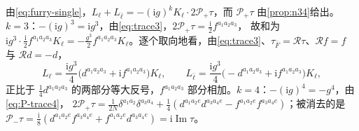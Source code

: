 \documentclass[UTF8,a4paper,11pt,fontset=fandol]{ctexart}
\makeatletter
\theoremstyle{cplain}
\theoremstyle{cdefinition}
\theoremstyle{cremark}
\renewcommand{\proofname}{证明}
\renewenvironment{proof}[1][\proofname]{\par\pushQED{\qed}\normalfont\topsep6\p@\@plus6\p@\relax
  \trivlist\item[\hskip\labelsep\itshape #1\hspace{0.5em}]\ignorespaces}{\popQED\endtrivlist\@endpefalse}
\numberwithin{equation}{section}
\DeclareMathOperator{\Imag}{Im}
\newcommand{\Rop}{\mathcal{R}}                       %
\newcommand{\Pp}{\mathcal{P}_{+}}                    %
\newcommand{\Pm}{\mathcal{P}_{-}}                    %
\newcommand{\ii}{\mathrm{i}}                        %
\makeatother
\begin{document}
\begin{proof}
由\cref{eq:furry-single}，$L_\ell+L_{\bar\ell}=-(\ii g)^kK_\ell\cdot2\Pp\tau$，而 $\Pp\tau$ 由\cref{prop:n34}给出。$k=3$：$-(\ii g)^3=\ii g^3$，由\cref{eq:trace3}，$2\Pp\tau=\frac{\ii}{2}f^{a_1a_2a_3}$，
故和为 $\ii g^3\cdot\frac{\ii}{2}f^{a_1a_2a_3}K_\ell=-\frac{g^3}{2}f^{a_1a_2a_3}K_\ell$。逐个取向地看，由\cref{eq:trace3}、$\tau_{\bar F}=\Rop\tau$、$\Rop f=f$ 与 $\Rop d=-d$，
\begin{equation}\label{eq:thmI-k3-orient}
L_\ell=\frac{\ii g^3}{4}\bigl(d^{a_1a_2a_3}+\ii f^{a_1a_2a_3}\bigr)K_\ell ,\qquad
L_{\bar\ell}=\frac{\ii g^3}{4}\bigl(-d^{a_1a_2a_3}+\ii f^{a_1a_2a_3}\bigr)K_\ell ,
\end{equation}
正比于 $\frac14d^{a_1a_2a_3}$ 的两部分等大反号，$f^{a_1a_2a_3}$ 部分相加。$k=4$：$-(\ii g)^4=-g^4$，由\cref{eq:P-trace4}，
$2\Pp\tau=\frac{1}{2N}\delta^{a_1a_2}\delta^{a_3a_4}+\frac14(d^{a_1a_2e}d^{a_3a_4e}-f^{a_1a_2e}f^{a_3a_4e})$；被消去的是 $\Pm\tau=\frac{\ii}{8}{(d^{a_1a_2e}f^{a_3a_4e}+f^{a_1a_2e}d^{a_3a_4e})}=\ii\Imag\tau$。
\end{proof}
\end{document}
